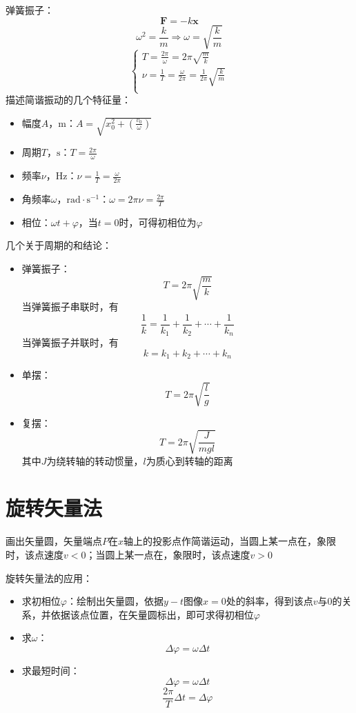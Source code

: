 \documentclass[12pt, a4paper, twoside]{ctexbook}
\begin{document}
{\sonti 弹簧振子}：
$$
\boldsymbol{F}=-k\boldsymbol{x}
$$
$$
\omega^2=\frac{k}{m} \Rightarrow \omega=\sqrt{\frac{k}{m}}
$$
$$
\left\{ \begin{array}{l}
	T=\frac{2\pi}{\omega}=2\pi \sqrt{\frac{m}{k}}\\
	\nu =\frac{1}{T}=\frac{\omega}{2\pi}=\frac{1}{2\pi}\sqrt{\frac{k}{m}}\\
\end{array} \right. 
$$
\newpage
{\sonti 描述简谐振动的几个特征量}：
\begin{itemize}
    \item 幅度$A$，$\mathrm{m}$：$A=\sqrt{x_0^2+\left(\frac{v_0}{\omega}\right)}$
    \item 周期$T$，$\mathrm{s}$：$T=\frac{2\pi}{\omega}$
    \item 频率$\nu$，$\mathrm{Hz}$：$\nu=\frac{1}{T}=\frac{\omega}{2\pi}$
    \item 角频率$\omega$，$\mathrm{rad}\cdot\mathrm{s}^{-1}$：$\omega=2\pi\nu=\frac{2\pi}{T}$
    \item 相位：$\omega t+\varphi$，当$t=0$时，可得初相位为$\varphi$
\end{itemize}

{\sonti 几个关于周期的和结论}：
\begin{itemize}
    \item 弹簧振子：
    $$
    T=2\pi\sqrt{\frac{m}{k}}
    $$
    当弹簧振子串联时，有
    $$
    \frac{1}{k}=\frac{1}{k_1}+\frac{1}{k_2}+\cdots+\frac{1}{k_n}
    $$
    当弹簧振子并联时，有
    $$
    k=k_1+k_2+\cdots+k_n
    $$
    \item 单摆：
    $$
    T=2\pi\sqrt{\frac{l}{g}}
    $$
    \item 复摆：
    $$
    T=2\pi\sqrt{\frac{J}{mgl}}
    $$
    其中$J$为绕转轴的转动惯量，$l$为质心到转轴的距离
\end{itemize}
\section{旋转矢量法}
画出矢量圆，矢量端点$P$在$x$轴上的投影点作简谐运动，当圆上某一点在\uppercase\expandafter{}，\uppercase\expandafter{}象限时，该点速度$v<0$；当圆上某一点在\uppercase\expandafter{}，\uppercase\expandafter{}象限时，该点速度$v>0$

{\sonti 旋转矢量法的应用}：
\begin{itemize}
    \item 求初相位$\varphi$：绘制出矢量圆，依据$y-t$图像$x=0$处的斜率，得到该点$v$与$0$的关系，并依据该点位置，在矢量圆标出，即可求得初相位$\varphi$
    \item 求$\omega$：
    $$
    \Delta\varphi=\omega\Delta t
    $$
    \item 求最短时间：
    $$
    \Delta\varphi=\omega\Delta t
    $$
    $$
    \frac{2\pi}{T}\Delta t=\Delta\varphi
    $$
\end{itemize}
\end{document}

